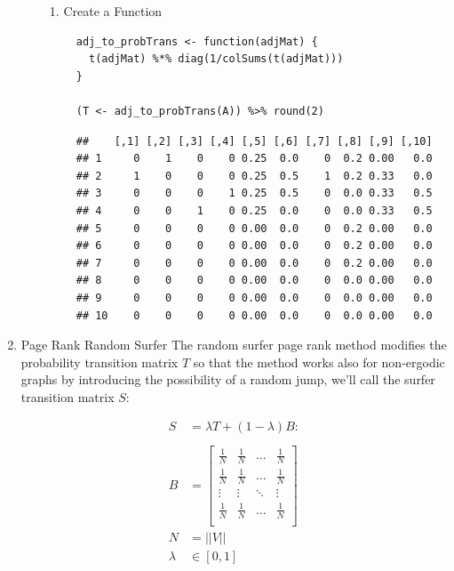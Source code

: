 \documentclass[11pt]{article}
\begin{document}
\begin{enumerate}
\begin{enumerate}
\begin{enumerate}
\item Create a Function
\label{create-a-function}
\lstset{language=r,label= ,caption= ,captionpos=b,numbers=none}
\begin{lstlisting}
  adj_to_probTrans <- function(adjMat) {
    t(adjMat) %*% diag(1/colSums(t(adjMat)))
  }

  (T <- adj_to_probTrans(A)) %>% round(2)
\end{lstlisting}

\begin{verbatim}
  ##    [,1] [,2] [,3] [,4] [,5] [,6] [,7] [,8] [,9] [,10]
  ## 1     0    1    0    0 0.25  0.0    0  0.2 0.00   0.0
  ## 2     1    0    0    0 0.25  0.5    1  0.2 0.33   0.0
  ## 3     0    0    0    1 0.25  0.5    0  0.0 0.33   0.5
  ## 4     0    0    1    0 0.25  0.0    0  0.0 0.33   0.5
  ## 5     0    0    0    0 0.00  0.0    0  0.2 0.00   0.0
  ## 6     0    0    0    0 0.00  0.0    0  0.2 0.00   0.0
  ## 7     0    0    0    0 0.00  0.0    0  0.2 0.00   0.0
  ## 8     0    0    0    0 0.00  0.0    0  0.0 0.00   0.0
  ## 9     0    0    0    0 0.00  0.0    0  0.0 0.00   0.0
  ## 10    0    0    0    0 0.00  0.0    0  0.0 0.00   0.0
\end{verbatim}
\end{enumerate}
\end{enumerate}

\item Page Rank Random Surfer
\label{page-rank-random-surfer}
The random surfer page rank method modifies the probability transition
matrix \(T\) so that the method works also for non-ergodic graphs by
introducing the possibility of a random jump, we'll call the surfer
transition matrix \(S\):

\begin{align}
    S &= \lambda T +  \left( 1- \lambda \right)B :\\
\ \\
    B&= \begin{bmatrix}
    \frac{1}{N} & \frac{1}{N} & \ldots & \frac{1}{N} \\
    \frac{1}{N} & \frac{1}{N} & \ldots & \frac{1}{N} \\
        \vdots      & \vdots      & \ddots & \vdots  \\
    \frac{1}{N} & \frac{1}{N} & \ldots & \frac{1}{N} \\
    \end{bmatrix} \label{eq:bgval1} \\
    N&= \left| \left| V \right| \right| \\
    \lambda &\in [0,1]
\end{align}


\end{enumerate}
\end{document}
